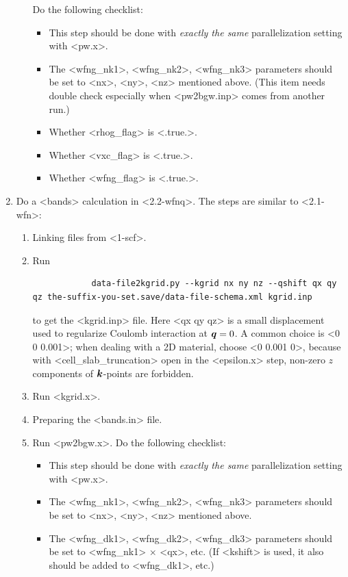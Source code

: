 \documentclass[hyperref, a4paper, 12pt]{report}
\def\texttt#1{<#1>}%
\newcommand{\shortcode}[1]{\texttt{#1}}
\begin{document}
\begin{enumerate}
\begin{enumerate}
        Do the following checklist:
        \begin{itemize}
            \item This step should be done 
            with \emph{exactly the same} parallelization setting with \shortcode{pw.x}.
            \item The \shortcode{wfng_nk1}, \shortcode{wfng_nk2}, \shortcode{wfng_nk3} 
            parameters should be set to \shortcode{nx}, \shortcode{ny}, \shortcode{nz}
            mentioned above.
            (This item needs double check especially 
            when \shortcode{pw2bgw.inp} comes from another run.)
            \item Whether \shortcode{rhog_flag} is \shortcode{.true.}.
            \item Whether \shortcode{vxc_flag} is \shortcode{.true.}.
            \item Whether \shortcode{wfng_flag} is \shortcode{.true.}.
        \end{itemize}
    \end{enumerate}
    \item Do a \shortcode{bands} calculation in \shortcode{2.2-wfnq}. 
    The steps are similar to \shortcode{2.1-wfn}:
    \begin{enumerate}
        \item Linking files from \shortcode{1-scf}.
        \item Run 
        \begin{lstlisting}
            data-file2kgrid.py --kgrid nx ny nz --qshift qx qy qz the-suffix-you-set.save/data-file-schema.xml kgrid.inp
        \end{lstlisting}
        to get the \shortcode{kgrid.inp} file.
        Here \shortcode{qx qy qz} is a small displacement 
        used to regularize Coulomb interaction at $\vb*{q} = 0$.
        A common choice is \shortcode{0 0 0.001};
        when dealing with a 2D material, choose \shortcode{0 0.001 0},
        because with \shortcode{cell_slab_truncation} open in the \shortcode{epsilon.x} step,
        non-zero $z$ components of $\vb*{k}$-points are forbidden.
        \item Run \shortcode{kgrid.x}.
        \item Preparing the \shortcode{bands.in} file.
        \item Run \shortcode{pw2bgw.x}. Do the following checklist:
        \begin{itemize}
            \item This step should be done 
            with \emph{exactly the same} parallelization setting with \shortcode{pw.x}.
            \item The \shortcode{wfng_nk1}, \shortcode{wfng_nk2}, \shortcode{wfng_nk3} 
            parameters should be set to \shortcode{nx}, \shortcode{ny}, \shortcode{nz}
            mentioned above.
            \item The \shortcode{wfng_dk1}, \shortcode{wfng_dk2}, \shortcode{wfng_dk3} 
            parameters should be set to \shortcode{wfng_nk1} $\times$ \shortcode{qx}, etc.
            (If \shortcode{kshift} is used, 
            it also should be added to \shortcode{wfng_dk1}, etc.)


\end{itemize}
\end{enumerate}
\end{enumerate}
\end{document}

